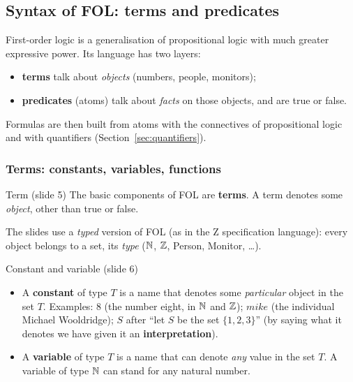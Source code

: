 \subsection{Syntax of FOL: terms and predicates}
\label{sec:fol-syntax}

First-order logic is a generalisation of propositional logic with much greater expressive
power. Its language has two layers:
\begin{itemize}[nosep]
  \item \textbf{terms} talk about \emph{objects} (numbers, people, monitors);
  \item \textbf{predicates} (atoms) talk about \emph{facts} on those objects, and are true
        or false.
\end{itemize}
Formulas are then built from atoms with the connectives of propositional logic and with
quantifiers (Section~\ref{sec:quantifiers}).

\subsubsection{Terms: constants, variables, functions}

\begin{nbdef}{Term (slide 5)}
The basic components of FOL are \textbf{terms}. A term denotes some \emph{object}, other
than true or false.
\end{nbdef}

The slides use a \emph{typed} version of FOL (as in the Z specification language): every
object belongs to a set, its \emph{type} ($\mathbb{N}$, $\mathbb{Z}$, Person, Monitor, \ldots).

\begin{nbdef}{Constant and variable (slide 6)}
\begin{itemize}[nosep]
  \item A \textbf{constant} of type $T$ is a name that denotes some \emph{particular}
        object in the set $T$. Examples: $8$ (the number eight, in $\mathbb{N}$ and $\mathbb{Z}$);
        $\mathit{mike}$ (the individual Michael Wooldridge); $S$ after ``let $S$ be the
        set $\{1,2,3\}$'' (by saying what it denotes we have given it an
        \textbf{interpretation}).
  \item A \textbf{variable} of type $T$ is a name that can denote \emph{any} value in the
        set $T$. A variable of type $\mathbb{N}$ can stand for any natural number.
\end{itemize}
\end{nbdef}

